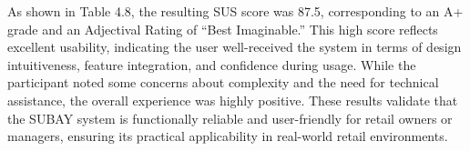 {As shown in Table 4.8, the resulting SUS score was 87.5, corresponding to an A+ grade and an Adjectival Rating of “Best Imaginable.” This high score reflects excellent usability, indicating the user well-received the system in terms of design intuitiveness, feature integration, and confidence during usage. While the participant noted some concerns about complexity and the need for technical assistance, the overall experience was highly positive. These results validate that the SUBAY system is functionally reliable and user-friendly for retail owners or managers, ensuring its practical applicability in real-world retail environments.

}